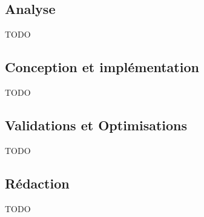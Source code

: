 \subsection*{Analyse}

TODO

\subsection*{Conception et implémentation}

TODO

\subsection*{Validations et Optimisations}

TODO

\subsection*{Rédaction}

TODO